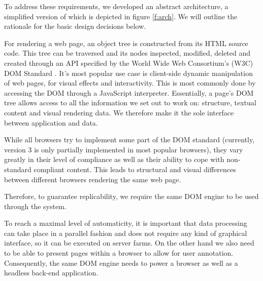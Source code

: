 To address these requirements, we developed an abstract architecture, a simplified version of which is depicted in figure \ref{f:arch}.
We will outline the rationale for the basic design decisions below.


For rendering a web page, an object tree is constructed from its HTML source code.
This tree can be traversed and its nodes inspected, modified, deleted and created through an API specified by the World Wide Web Consortium's (W3C) DOM Standard \cite{dom}.
It's most popular use case is client-side dynamic manipulation of web pages, for visual effects and interactivity.
This is most commonly done by accessing the DOM through a JavaScript interpreter.
Essentially, a page's DOM tree allows access to all the information we set out to work on: structure, textual content and visual rendering data.
We therefore make it the sole interface between application and data.

While all browsers try to implement some part of the DOM standard (currently, version 3 is only partially implemented in most popular browsers), they vary greatly in their level of compliance as well as their ability to cope with non-standard compliant content.
This leads to structural and visual differences between different browsers rendering the same web page.

Therefore, to guarantee replicability, we require the same DOM engine to be used through the system.


To reach a maximal level of automaticity, it is important that data processing can take place in a parallel fashion and does not require any kind of graphical interface, so it can be executed on server farms.
On the other hand we also need to be able to present pages within a browser to allow for user annotation.
Consequently, the same DOM engine needs to power a browser as well as a headless back-end application.




